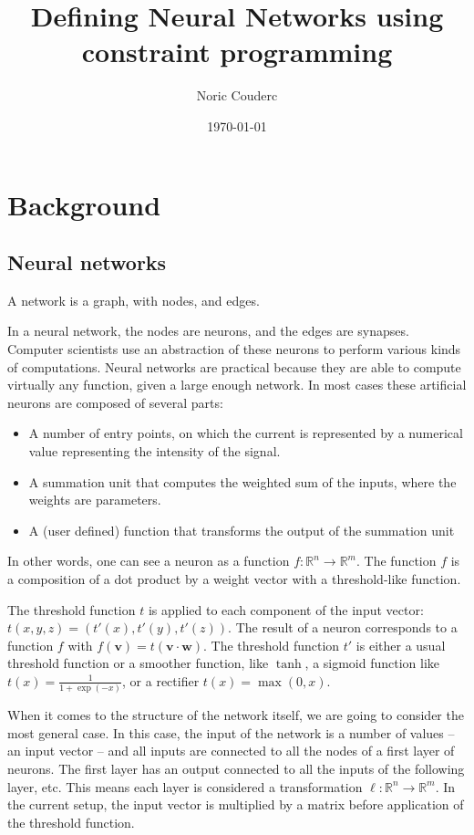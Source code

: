 \documentclass[a4paper, 10pt]{article}
\title{Defining Neural Networks using constraint programming}
\author{Noric Couderc}
\date{\today}
\begin{document}
\maketitle
\tableofcontents

\section{Background}

\subsection*{Neural networks}

A network is a graph, with nodes, and edges.

In a neural network, the nodes are neurons, and the edges are synapses. Computer
scientists use an abstraction of these neurons to perform various kinds of
computations. Neural networks are practical because they are able to compute
virtually any function, given a large enough network.
In most cases these artificial neurons are composed of several parts:
\begin{itemize}
    \item A number of entry points, on which the current is represented by a
        numerical value representing the intensity of the signal.
    \item A summation unit that computes the weighted sum of the inputs, where the
        weights are parameters.
    \item A (user defined) function that transforms the output of the summation unit
\end{itemize}

In other words, one can see a neuron as a function $f : \mathbb{R}^n \rightarrow
\mathbb{R}^m$.
The function $f$ is a composition of a dot product by a weight vector with a
threshold-like function.

The threshold function $t$ is applied to each component of the input vector:
$t(x, y, z) = (t'(x), t'(y), t'(z))$. The result of a neuron corresponds to a 
function $f$ with $f(\mathbf{v}) = t(\mathbf{v} \cdot \mathbf{w})$.  The threshold function
$t'$ is either a usual threshold function or a smoother function, like $\tanh$,
a sigmoid function  like $t(x) = \frac{1}{1 + \exp(-x)}$, or a rectifier 
$t(x) = \max(0, x)$.

When it comes to the structure of the network itself, we are going to consider
the most general case. In this case, the input of the network is a number of
values  -- an input vector -- and all inputs are connected to all the nodes of a
first layer of neurons. The first layer has an output connected to all the
inputs of the following layer, etc. This means each layer is considered a
transformation $\ell : \mathbb{R}^n \rightarrow \mathbb{R}^m$. In the current
setup, the input vector is multiplied by a matrix before application of the
threshold function. 
\end{document}
